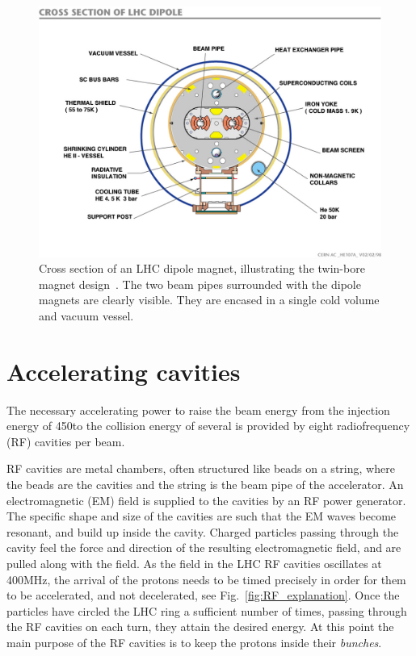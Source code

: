 \begin{figure}[t]
  \centering
  \includegraphics[width=\textwidth,clip=true,trim=0 2cm 0 2cm]
  {figures/lhc/lhc_dipole_cross_section_cds841539.jpg} 
  \caption{Cross section of an LHC dipole magnet, illustrating the twin-bore magnet
design~\cite{cds:841539}. The two beam pipes surrounded with the dipole magnets are clearly
visible. They are encased in a single cold volume and vacuum vessel. 
  \label{fig:lhc_twin_bore}}
\end{figure}


\section{Accelerating cavities}

The necessary accelerating power to raise the beam energy from the injection energy of 450\GeV to
the collision energy of several \TeV is provided by eight radiofrequency (RF) cavities per beam. 

RF cavities are metal chambers, often structured like beads on a string, where the beads are the
cavities and the string is the beam pipe of the accelerator.
An electromagnetic (EM) field is supplied to the cavities by an RF power generator. The specific
shape and size of the cavities are such that the EM waves become resonant, and build up inside the
cavity. 
Charged particles passing through the cavity feel the force and direction of the resulting
electromagnetic field, and are pulled along with the field. 
As the field in the LHC RF cavities oscillates at 400\unit{MHz}, the arrival of the protons needs to
be timed precisely in order for them to be accelerated, and not decelerated, see 
Fig.~\ref{fig:RF_explanation}. 
Once the particles have circled the LHC ring a sufficient number of times, passing through
the RF cavities on each turn, they attain the desired energy. At this point the main purpose of the
RF cavities is to keep the protons inside their \textit{bunches}. 

